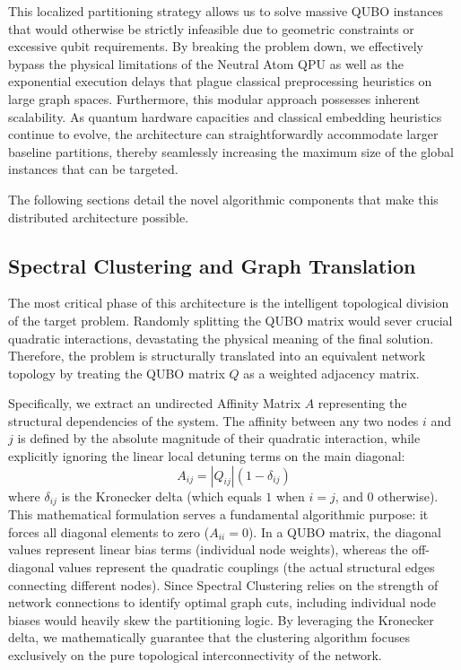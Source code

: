 This localized partitioning strategy allows us to solve massive QUBO instances that would otherwise be strictly infeasible due to geometric constraints or excessive qubit requirements. By breaking the problem down, we effectively bypass the physical limitations of the Neutral Atom QPU as well as the exponential execution delays that plague classical preprocessing heuristics on large graph spaces.
Furthermore, this modular approach possesses inherent scalability. As quantum hardware capacities and classical embedding heuristics continue to evolve, the architecture can straightforwardly accommodate larger baseline partitions, thereby seamlessly increasing the maximum size of the global instances that can be targeted. 

The following sections detail the novel algorithmic components that make this distributed architecture possible.

\subsection{Spectral Clustering and Graph Translation}
\label{subsec:spectral_clustering}

The most critical phase of this architecture is the intelligent topological division of the target problem. Randomly splitting the QUBO matrix would sever crucial quadratic interactions, devastating the physical meaning of the final solution. Therefore, the problem is structurally translated into an equivalent network topology by treating the QUBO matrix $Q$ as a weighted adjacency matrix.

Specifically, we extract an undirected Affinity Matrix $A$ representing the structural dependencies of the system. The affinity between any two nodes $i$ and $j$ is defined by the absolute magnitude of their quadratic interaction, while explicitly ignoring the linear local detuning terms on the main diagonal:
\begin{equation}
    A_{ij} = |Q_{ij}| (1 - \delta_{ij})
\end{equation}
where $\delta_{ij}$ is the Kronecker delta (which equals $1$ when $i=j$, and $0$ otherwise). This mathematical formulation serves a fundamental algorithmic purpose: it forces all diagonal elements to zero ($A_{ii} = 0$). In a QUBO matrix, the diagonal values represent linear bias terms (individual node weights), whereas the off-diagonal values represent the quadratic couplings (the actual structural edges connecting different nodes). Since Spectral Clustering relies on the strength of network connections to identify optimal graph cuts, including individual node biases would heavily skew the partitioning logic. By leveraging the Kronecker delta, we mathematically guarantee that the clustering algorithm focuses exclusively on the pure topological interconnectivity of the network.

